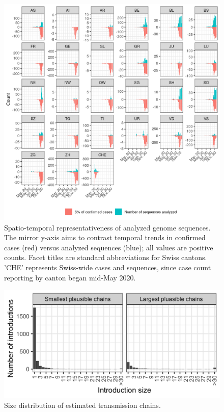 \documentclass[9pt,twoside,lineno]{pnas-new}
\begin{document}
\begin{figure}
\centering
\includegraphics[width = 11.4cm]{figures/CHE_downsampling.png}
\caption{Spatio-temporal representativeness of analyzed genome sequences. The mirror y-axis aims to contrast temporal trends in confirmed cases (red) versus analyzed sequences (blue); all values are positive counts. Facet titles are standard abbreviations for Swiss cantons. 'CHE' represents Swiss-wide cases and sequences, since case count reporting by canton began mid-May 2020.}  
\label{fig:downsampling_representativeness}
\end{figure}

\begin{figure}
\centering
\includegraphics[width = 11.4cm]{figures/chain_size_dist.png}
\caption{Size distribution of estimated transmission chains.}  
\label{fig:chain_size_dist}
\end{figure}
\end{document}
